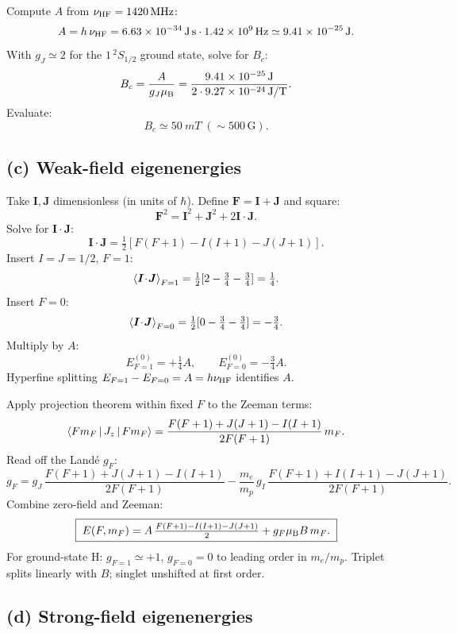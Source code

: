 \documentclass[11pt]{article}
\begin{document}
Compute $A$ from $\nu_{\rm HF}=\SI{1420}{MHz}$:
\[
A=h\,\nu_{\rm HF}=\SI{6.63e-34}{J\,s}\cdot\SI{1.42e9}{Hz}\simeq\SI{9.41e-25}{J}.
\]
With $g_J\simeq 2$ for the $1\,^2S_{1/2}$ ground state, solve for $B_c$:
\[
B_c=\frac{A}{g_J\mu_{\rm B}}=\frac{\SI{9.41e-25}{J}}{2\cdot\SI{9.27e-24}{J/T}}.
\]
Evaluate:
\begin{equation}
\boxed{\;B_c\simeq\SI{50}{mT}\;(\sim\!500\,\mathrm{G}).\;}
\label{eq:Bc-est}
\end{equation}

\subsection*{(c) Weak-field eigenenergies}

Take $\bm I,\bm J$ dimensionless (in units of $\hbar$). Define $\bm F=\bm I+\bm J$ and square:
\[
\bm F^{2}=\bm I^{2}+\bm J^{2}+2\bm I\!\cdot\!\bm J.
\]
Solve for $\bm I\cdot\bm J$:
\[
\bm I\!\cdot\!\bm J=\tfrac{1}{2}[F(F+1)-I(I+1)-J(J+1)].
\]
Insert $I=J=1/2$, $F=1$:
\[
\Braket{\bm I\!\cdot\!\bm J}_{F=1}=\tfrac{1}{2}[2-\tfrac34-\tfrac34]=\tfrac14.
\]
Insert $F=0$:
\[
\Braket{\bm I\!\cdot\!\bm J}_{F=0}=\tfrac{1}{2}[0-\tfrac34-\tfrac34]=-\tfrac34.
\]
Multiply by $A$:
\[
E_{F=1}^{(0)}=+\tfrac14 A,\qquad E_{F=0}^{(0)}=-\tfrac34 A.
\]
Hyperfine splitting $E_{F=1}-E_{F=0}=A=h\nu_{\rm HF}$ identifies $A$.

Apply projection theorem within fixed $F$ to the Zeeman terms:
\[
\Braket{F m_F|J_z|F m_F}=\frac{F(F+1)+J(J+1)-I(I+1)}{2F(F+1)}\,m_F.
\]
Read off the Land\'e $g_F$:
\[
g_F=g_J\,\frac{F(F+1)+J(J+1)-I(I+1)}{2F(F+1)}-\frac{m_e}{m_p}\,g_I\,\frac{F(F+1)+I(I+1)-J(J+1)}{2F(F+1)}.
\]
Combine zero-field and Zeeman:
\begin{equation}
\boxed{\;E(F,m_F)=A\,\tfrac{F(F+1)-I(I+1)-J(J+1)}{2}+g_F\mu_{\rm B}B\,m_F.\;}
\label{eq:weak-field-E}
\end{equation}
For ground-state H: $g_{F=1}\simeq +1$, $g_{F=0}=0$ to leading order in $m_e/m_p$. Triplet splits linearly with $B$; singlet unshifted at first order.

\subsection*{(d) Strong-field eigenenergies}
\end{document}

